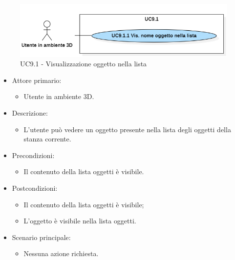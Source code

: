 \begin{figure}[H]
  \renewcommand{\thefigure}{6}
  \includegraphics[width=\linewidth]{./res/images/UC9.1.png}
  \caption{UC9.1 - Visualizzazione oggetto nella lista}
  \label{fig:UC 9.1}
\end{figure}

\begin{itemize}

	\item Attore primario: 
	\begin{itemize}
		\item Utente in ambiente 3D.
	\end{itemize}
	\item Descrizione:
	\begin{itemize}
		\item L'utente può vedere un oggetto presente nella lista degli oggetti della stanza corrente.
	\end{itemize}
	
	\item Precondizioni:
	\begin{itemize}
		\item Il contenuto della lista oggetti è visibile.
	\end{itemize}
	
	\item Postcondizioni:
	\begin{itemize}
		\item Il contenuto della lista oggetti è visibile;
		\item L'oggetto è visibile nella lista oggetti.
	\end{itemize}
	
	\item Scenario principale:
	\begin{itemize}
		\item Nessuna azione richiesta.
	\end{itemize}
	
\end{itemize}

